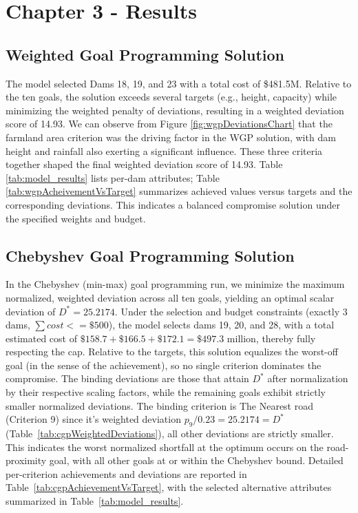 \section{Chapter 3 - Results}\label{sec:results}

\subsection{Weighted Goal Programming Solution}
The model selected Dams 18, 19, and 23 with a total cost of \$481.5M. Relative to the ten goals, the solution exceeds several targets (e.g., height, capacity) while minimizing the weighted penalty of deviations, resulting in a weighted deviation score of 14.93. We can observe from Figure \ref{fig:wgpDeviationsChart} that the farmland area criterion was the driving factor in the WGP solution, with dam height and rainfall also exerting a significant influence. These three criteria together shaped the final weighted deviation score of 14.93. Table \ref{tab:model_results} lists per-dam attributes; Table \ref{tab:wgpAcheivementVsTarget}    summarizes achieved values versus targets and the corresponding deviations. This indicates a balanced compromise solution under the specified weights and budget.




\subsection{Chebyshev Goal Programming Solution}
In the Chebyshev (min-max) goal programming run, we minimize the maximum normalized, weighted deviation across all ten goals, yielding an optimal scalar deviation of $ D^* = 25.2174$. Under the selection and budget constraints (exactly 3 dams, $\sum cost <= \$500$), the model selects dams 19, 20, and 28, with a total estimated cost of $\$158.7 + \$166.5 + \$172.1 = \$497.3$ million, thereby fully respecting the cap. Relative to the targets, this solution equalizes the worst-off goal (in the sense of the achievement), so no single criterion dominates the compromise. The binding deviations are those that attain $ D^*$ after normalization by their respective scaling factors, while the remaining goals exhibit strictly smaller normalized deviations. The binding criterion is The Nearest road (Criterion 9) since it's weighted deviation $p_9/0.23 = 25.2174 = D^*$ (Table~\ref{tab:cgpWeightedDeviations}), all other deviations are strictly smaller. This indicates the worst normalized shortfall at the optimum occurs on the road-proximity goal, with all other goals at or within the Chebyshev bound. Detailed per-criterion achievements and deviations are reported in Table~\ref{tab:cgpAchievementVsTarget}, with the selected alternative attributes summarized in Table~\ref{tab:model_results}.

